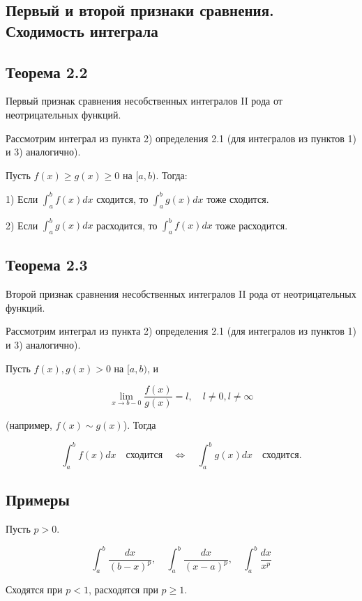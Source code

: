 {
\subsection{Первый и второй признаки сравнения. Сходимость интеграла}
\subsection*{Теорема 2.2}

Первый признак сравнения несобственных интегралов II рода от неотрицательных функций.

Рассмотрим интеграл из пункта 2) определения 2.1 (для интегралов из пунктов 1) и 3) аналогично).

Пусть \( f(x) \geq g(x) \geq 0 \) на \( [a, b) \). Тогда:

1) Если \( \int_{a}^{b} f(x)dx \) сходится, то \( \int_{a}^{b} g(x)dx \) тоже сходится.

2) Если \( \int_{a}^{b} g(x)dx \) расходится, то \( \int_{a}^{b} f(x)dx \) тоже расходится.

\subsection*{Теорема 2.3}

Второй признак сравнения несобственных интегралов II рода от неотрицательных функций.

Рассмотрим интеграл из пункта 2) определения 2.1 (для интегралов из пунктов 1) и 3) аналогично).

Пусть \( f(x), g(x) > 0 \) на \([a, b)\), и 

\[
\lim_{x \to b-0} \frac{f(x)}{g(x)} = l, \quad l \neq 0, l \neq \infty
\]

(например, \( f(x) \sim g(x) \)). Тогда

\[
\int_{a}^{b} f(x) dx \quad \text{сходится} \quad \iff \quad \int_{a}^{b} g(x) dx \quad \text{сходится}.
\]

\subsection*{Примеры}

Пусть \( p > 0 \).



\[
\int_{a}^{b} \frac{dx}{(b-x)^p}, \quad \int_{a}^{b} \frac{dx}{(x-a)^p}, \quad \int_{a}^{b} \frac{dx}{x^p}
\]



Сходятся при \( p < 1 \), расходятся при \( p \geq 1 \).



}

